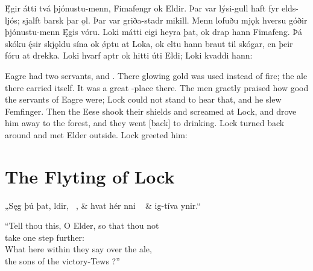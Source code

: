 \bpg\bpa Ę́gir átti tvá þjónustu-menn, Fimafengr ok Eldir. Þar var lýsi-gull haft fyr elds-ljós; sjalft barsk þar ǫl. Þar var griða-stadr mikill. Menn lofuðu mjǫk hversu góðir þjónustu-menn Ę́gis vóru. Loki mátti eigi heyra þat, ok drap hann Fimafeng. Þá skóku ę́sir skjǫldu sína ok ǿptu at Loka, ok eltu hann braut til skógar, en þeir fóru at drekka. Loki hvarf aptr ok hitti úti Eldi; Loki kvaddi hann:\epa

\bpb Eagre had two servants,  and . There glowing gold was used instead of fire; the ale there carried itself. It was a great -place there. The men graetly praised how good the servants of Eagre were; Lock could not stand to hear that, and he slew Femfinger. Then the Eese shook their shields and screamed at Lock, and drove him away to the forest, and they went [back] to drinking. Lock turned back around and met Elder outside. Lock greeted him:\epb\epg

\sectionline

\section{The Flyting of Lock}

\bvg\bva%
„Sęg þú þat, ldir, \hld\ , &
hvat hér nni \hld\  &
\ind {}ig-tíva ynir.“\eva

\bvb “Tell thou this, O Elder, so that thou not \\
\ind take one step further: \\
What here within they say over the ale, \\
\ind the sons of the victory-Tews ?”\evb\evg


